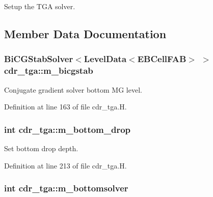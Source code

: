 Setup the T\+GA solver. 



\subsection{Member Data Documentation}
\subsubsection[{\texorpdfstring{m\+\_\+bicgstab}{m_bicgstab}}]{\setlength{\rightskip}{0pt plus 5cm}Bi\+C\+G\+Stab\+Solver$<$Level\+Data$<$E\+B\+Cell\+F\+AB$>$ $>$ cdr\+\_\+tga\+::m\+\_\+bicgstab\hspace{0.3cm}{\ttfamily [protected]}}\hypertarget{classcdr__tga_ac602ec9e346a1443966b1182174c6818}{}\label{classcdr__tga_ac602ec9e346a1443966b1182174c6818}


Conjugate gradient solver bottom MG level. 



Definition at line 163 of file cdr\+\_\+tga.\+H.

\subsubsection[{\texorpdfstring{m\+\_\+bottom\+\_\+drop}{m_bottom_drop}}]{\setlength{\rightskip}{0pt plus 5cm}int cdr\+\_\+tga\+::m\+\_\+bottom\+\_\+drop\hspace{0.3cm}{\ttfamily [protected]}}\hypertarget{classcdr__tga_afe42b10c1f52be8eb7a4d1b5a0e30277}{}\label{classcdr__tga_afe42b10c1f52be8eb7a4d1b5a0e30277}


Set bottom drop depth. 



Definition at line 213 of file cdr\+\_\+tga.\+H.

\subsubsection[{\texorpdfstring{m\+\_\+bottomsolver}{m_bottomsolver}}]{\setlength{\rightskip}{0pt plus 5cm}int cdr\+\_\+tga\+::m\+\_\+bottomsolver\hspace{0.3cm}{\ttfamily [protected]}}\hypertarget{classcdr__tga_a7f85e3c3ef8712e8e3b24feb081f1d06}{}\label{classcdr__tga_a7f85e3c3ef8712e8e3b24feb081f1d06}


